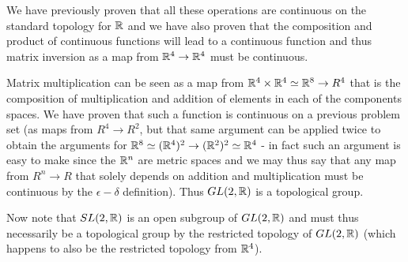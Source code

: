 We have previously proven that all these operations are continuous on the standard topology for $\mathbb{R}$ and we have also proven that the composition and product of continuous functions will lead to a continuous  function and thus matrix inversion as a map from $\mathbb{R}^4 \to \mathbb{R}^4$ must be continuous. \par
Matrix multiplication can be seen as a map from $\mathbb{R}^4 \times \mathbb{R}^4 \simeq \mathbb{R}^8 \to R^4$ that is the composition of multiplication and addition of elements in each of the components spaces. We have proven that such a function is continuous on a previous problem set (as maps from $R^4\to R^2$, but that same argument can be applied twice to obtain the arguments for $\mathbb{R}^8 \simeq (\mathbb{R}^4)^2 \to (\mathbb{R}^2)^2 \simeq \mathbb{R}^4$ - in fact such an argument is easy to make since the $\mathbb{R}^n$ are metric spaces and we may thus say that any map from $R^n\to R$ that solely depends on addition and multiplication must be continuous by the $\epsilon-\delta$ definition).
Thus $GL(2,\mathbb{R})$ is a topological group. \par
Now note that $SL(2,\mathbb{R})$ is an open subgroup of $GL(2,\mathbb{R})$ and must thus necessarily be a topological group by the restricted topology of $GL(2,\mathbb{R})$ (which happens to also be the restricted topology from $\mathbb{R}^4$).
